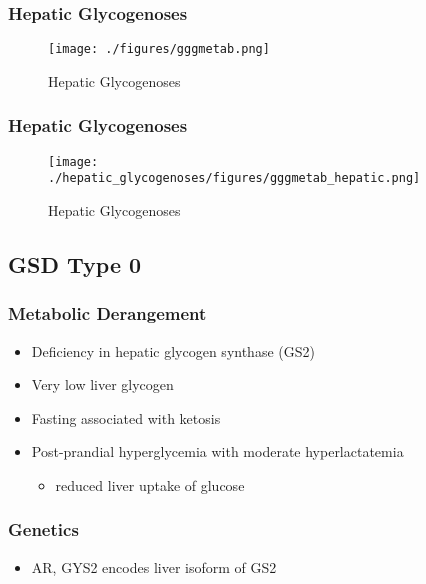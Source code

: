 \documentclass{scrartcl}
\begin{document}
\subsubsection{Hepatic Glycogenoses}
\label{sec:orgd89aa89}

\begin{figure}[htbp]
\centering
\texttt{[image: ./figures/gggmetab.png]}
\caption[Hepatic Glycogenoses]{\label{fig:org3db746e}
Hepatic Glycogenoses}
\end{figure}



\subsubsection{Hepatic Glycogenoses}
\label{sec:org6377439}

\begin{figure}[htbp]
\centering
\texttt{[image: ./hepatic\_glycogenoses/figures/gggmetab\_hepatic.png]}
\caption[Hepatic Glycogenoses]{\label{fig:orgdb263d6}
Hepatic Glycogenoses}
\end{figure}

\subsection{GSD Type 0}
\label{sec:org0784dda}
\subsubsection{Metabolic Derangement}
\label{sec:org8571000}
\begin{itemize}
\item Deficiency in hepatic glycogen synthase (GS2)
\item Very low liver glycogen
\item Fasting associated with ketosis
\item Post-prandial hyperglycemia with moderate hyperlactatemia
\begin{itemize}
\item reduced liver uptake of glucose
\end{itemize}
\end{itemize}

\subsubsection{Genetics}
\label{sec:org624f082}
\begin{itemize}
\item AR, GYS2 encodes liver isoform of GS2
\end{itemize}
\end{document}
